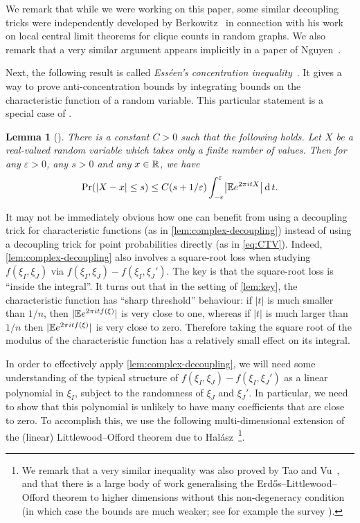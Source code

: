\documentclass{daj}
\theoremstyle{plain}
\theoremstyle{plain}
\newtheorem{lem}[thm]{Lemma}
\theoremstyle{plain}
\theoremstyle{plain}
\theoremstyle{definition}
\theoremstyle{plain}
\theoremstyle{plain}
\theoremstyle{definition}
\theoremstyle{definition}
\theoremstyle{plain}
\let\originalleft\left
\let\originalright\right
\renewcommand{\left}{\mathopen{}\mathclose\bgroup\originalleft}
\renewcommand{\right}{\aftergroup\egroup\originalright}
\begin{document}
We remark that while we were working on this paper, some similar decoupling
tricks were independently developed by Berkowitz~\cite{Ber18} in
connection with his work on local central limit theorems for clique counts in random
graphs. We also remark that a very similar argument appears implicitly in a paper of Nguyen~\cite{Ngu12}.

Next, the following result is called \emph{Ess\'een's concentration inequality}~\cite{Ess66}. It gives a way to prove anti-concentration bounds by integrating bounds on the characteristic function of a random variable. This particular statement is a special case of \cite[Lemma~7.17]{TV}.

\begin{lem}[\cite{TV}]
\label{lem:esseen}There is a constant $C>0$ such that the following holds. Let $X$ be a real-valued random variable which takes only a finite number of values. Then for any $\varepsilon>0$, any $s>0$ and any $x\in \mathbb{R}$, we have
\[ \Pr\left(\left|X-x\right|\le s\right)\le C\left(s+1/\varepsilon\right)\int_{-\varepsilon}^{\varepsilon}\left|\E e^{2\pi itX}\right|\d t.\]
\end{lem}

It may not be immediately obvious how one can benefit from using a decoupling trick for characteristic functions (as in \cref{lem:complex-decoupling}) instead of using a decoupling trick for point probabilities directly (as in \cref{eq:CTV}). Indeed, \cref{lem:complex-decoupling} also involves a square-root loss when studying $f(\xi_I,\xi_J)$ via $f(\xi_{I},\xi_{J})-f(\xi_{I},\xi_{J}')$. The key is that the square-root loss is ``inside the integral''. It turns out that in the setting of \cref{lem:key}, the characteristic function has ``sharp threshold'' behaviour: if $|t|$ is much smaller than $1/n$, then $|\mathbb{E} e^{2\pi i t f(\xi)}|$ is very close to one, whereas if $|t|$ is much larger than $1/n$ then $|\mathbb{E} e^{2\pi i t f(\xi)}|$ is very close to zero. Therefore taking the square root of the modulus of the characteristic function has a relatively small effect on its integral.

In order to effectively apply \cref{lem:complex-decoupling}, we will need some understanding of the typical structure of $f(\xi_{I},\xi_{J})-f(\xi_{I},\xi_{J}')$ as a linear polynomial in $\xi_{I}$, subject to the randomness of $\xi_{J}$ and $\xi_{J}'$. In particular, we need to show that this polynomial is unlikely to have many coefficients that are close to zero. To accomplish this, we use 
the following multi-dimensional extension of the (linear) Littlewood--Offord theorem
due to Hal\'asz~\cite{Hal77}\footnote{We remark that a very similar inequality was also proved by Tao and
Vu~\cite[Theorem~1.4]{TV12}, and that there is a large body of work
generalising the Erd\H os--Littlewood--Offord theorem to higher
dimensions without this non-degeneracy condition (in which case the
bounds are much weaker; see for example the survey \cite[Section~2]{NV13}).}.
\end{document}
